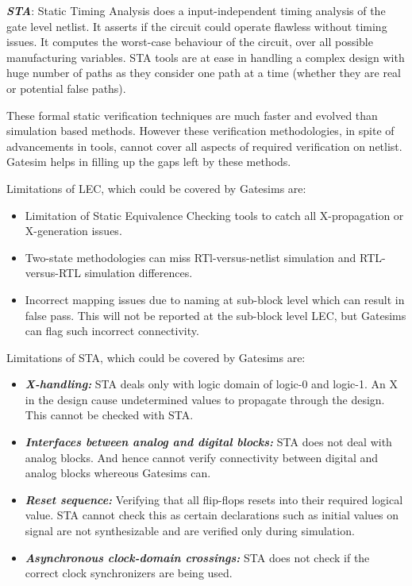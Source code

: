 \emph {\bf STA}: Static Timing Analysis does a input-independent timing analysis of the gate level netlist. It asserts if the circuit could operate flawless without timing issues. It computes the worst-case behaviour of the circuit, over all possible manufacturing variables. STA tools are at ease in handling a complex design with huge number of paths as they consider one path at a time (whether they are real or potential false paths). 



These formal static verification techniques are much faster and evolved than simulation based methods. However these verification methodologies, in spite of advancements in tools, cannot cover all aspects of required verification on netlist. Gatesim helps in filling up the gaps left by these methods. 

Limitations of LEC, which could be covered by Gatesims are:
\begin{itemize}
	\item Limitation of Static Equivalence Checking tools to catch all X-propagation or X-generation issues.
	\item Two-state methodologies can miss RTl-versus-netlist simulation and RTL-versus-RTL simulation differences.
	\item Incorrect mapping issues due to naming at sub-block level which can result in false pass. This will not be reported at the sub-block level LEC, but Gatesims can flag such incorrect connectivity.
\end{itemize}

Limitations of STA, which could be covered by Gatesims are:
\begin{itemize}
	\item \emph{\bf X-handling:} STA deals only with logic domain of logic-0 and logic-1. An X in the design cause undetermined values to propagate through the design. This cannot be checked with STA.
	\item \emph{\bf Interfaces between analog and digital blocks:} STA does not deal with analog blocks. And hence cannot verify connectivity between digital and analog blocks whereous Gatesims can.
	\item \emph{\bf Reset sequence:} Verifying that all flip-flops resets into their required logical value. STA cannot check this as certain declarations such as initial values on signal are not synthesizable and are verified only during simulation.
	\item \emph{\bf Asynchronous clock-domain crossings:} STA does not check if the correct clock synchronizers are being used.
\end{itemize}








